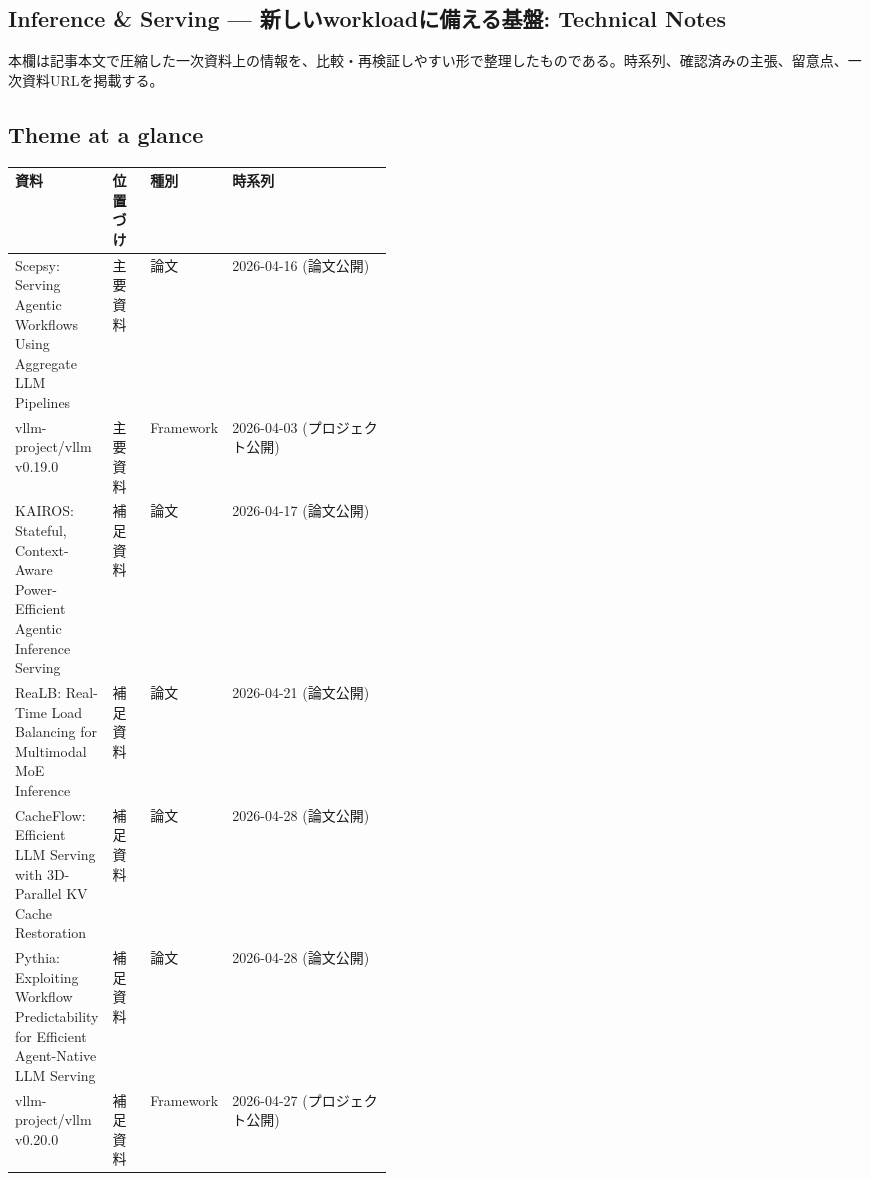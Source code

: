 \subsection*{Inference \& Serving — 新しいworkloadに備える基盤: Technical Notes}
本欄は記事本文で圧縮した一次資料上の情報を、比較・再検証しやすい形で整理したものである。時系列、確認済みの主張、留意点、一次資料URLを掲載する。
\medskip
\subsection*{Theme at a glance}
\begin{center}
\footnotesize
\begin{tabularx}{\linewidth}{@{}p{0.20\linewidth}p{0.10\linewidth}p{0.14\linewidth}X@{}}
\toprule
資料 & 位置づけ & 種別 & 時系列 \\
\midrule
Scepsy: Serving Agentic Workflows Using Aggregate LLM Pipelines & 主要資料 & 論文 & 2026-04-16 (論文公開) \\
vllm-project/vllm v0.19.0 & 主要資料 & Framework & 2026-04-03 (プロジェクト公開) \\
KAIROS: Stateful, Context-Aware Power-Efficient Agentic Inference Serving & 補足資料 & 論文 & 2026-04-17 (論文公開) \\
ReaLB: Real-Time Load Balancing for Multimodal MoE Inference & 補足資料 & 論文 & 2026-04-21 (論文公開) \\
CacheFlow: Efficient LLM Serving with 3D-Parallel KV Cache Restoration & 補足資料 & 論文 & 2026-04-28 (論文公開) \\
Pythia: Exploiting Workflow Predictability for Efficient Agent-Native LLM Serving & 補足資料 & 論文 & 2026-04-28 (論文公開) \\
vllm-project/vllm v0.20.0 & 補足資料 & Framework & 2026-04-27 (プロジェクト公開) \\
\bottomrule
\end{tabularx}
\end{center}
\normalsize

